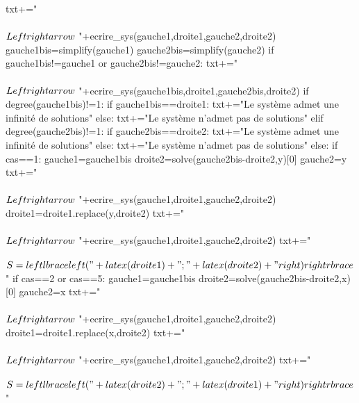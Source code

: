 \begin{pycode}
{    txt+="\\\\ $ \\Leftrightarrow $ "+ecrire_sys(gauche1,droite1,gauche2,droite2)
    gauche1bis=simplify(gauche1)
    gauche2bis=simplify(gauche2)
    if gauche1bis!=gauche1 or gauche2bis!=gauche2:
        txt+="\\\\ $ \\Leftrightarrow $ "+ecrire_sys(gauche1bis,droite1,gauche2bis,droite2)
    if degree(gauche1bis)!=1:
        if gauche1bis==droite1:
            txt+="Le système admet une infinité de solutions"
        else:
            txt+="Le système n'admet pas de solutions"
    elif degree(gauche2bis)!=1:
        if gauche2bis==droite2:
            txt+="Le système admet une infinité de solutions"
        else:
            txt+="Le système n'admet pas de solutions"
    else:
        if cas==1:
            gauche1=gauche1bis
            droite2=solve(gauche2bis-droite2,y)[0]
            gauche2=y
            txt+="\\\\ $ \\Leftrightarrow $ "+ecrire_sys(gauche1,droite1,gauche2,droite2)
            droite1=droite1.replace(y,droite2)
            txt+="\\\\ $ \\Leftrightarrow $ "+ecrire_sys(gauche1,droite1,gauche2,droite2)
            txt+="\\\\ $S=\\left\\lbrace \\left("+latex(droite1)+" ; "+latex(droite2)+" \\right) \\right\\rbrace$"
        if cas==2 or cas==5:
            gauche1=gauche1bis
            droite2=solve(gauche2bis-droite2,x)[0]
            gauche2=x
            txt+="\\\\ $ \\Leftrightarrow $ "+ecrire_sys(gauche1,droite1,gauche2,droite2)
            droite1=droite1.replace(x,droite2)
            txt+="\\\\ $ \\Leftrightarrow $ "+ecrire_sys(gauche1,droite1,gauche2,droite2)
            txt+="\\\\ $S=\\left\\lbrace \\left("+latex(droite2)+" ; "+latex(droite1)+" \\right) \\right\\rbrace$"
}
\end{pycode}

